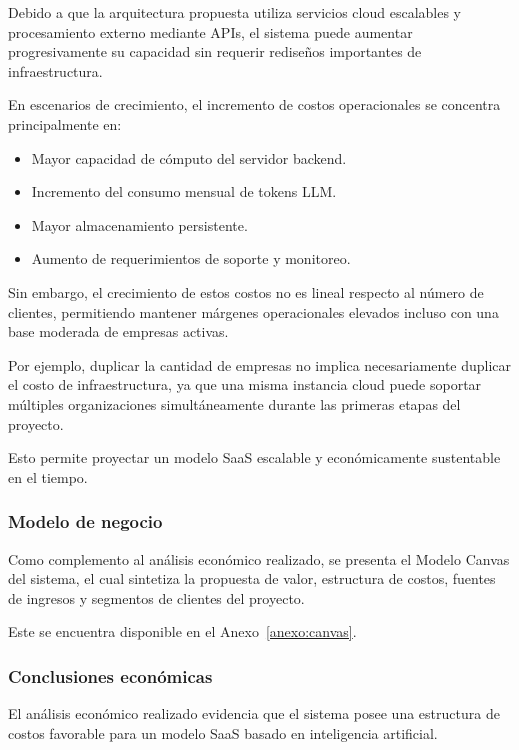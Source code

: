 Debido a que la arquitectura propuesta utiliza servicios cloud escalables y procesamiento externo mediante APIs, el sistema puede aumentar progresivamente su capacidad sin requerir rediseños importantes de infraestructura.

En escenarios de crecimiento, el incremento de costos operacionales se concentra principalmente en:

\begin{itemize}
    \item Mayor capacidad de cómputo del servidor backend.
    \item Incremento del consumo mensual de tokens LLM.
    \item Mayor almacenamiento persistente.
    \item Aumento de requerimientos de soporte y monitoreo.
\end{itemize}

Sin embargo, el crecimiento de estos costos no es lineal respecto al número de clientes, permitiendo mantener márgenes operacionales elevados incluso con una base moderada de empresas activas.

Por ejemplo, duplicar la cantidad de empresas no implica necesariamente duplicar el costo de infraestructura, ya que una misma instancia cloud puede soportar múltiples organizaciones simultáneamente durante las primeras etapas del proyecto.

Esto permite proyectar un modelo SaaS escalable y económicamente sustentable en el tiempo.

\subsubsection{Modelo de negocio}

Como complemento al análisis económico realizado, se presenta el Modelo Canvas del sistema, el cual sintetiza la propuesta de valor, estructura de costos, fuentes de ingresos y segmentos de clientes del proyecto.

Este se encuentra disponible en el Anexo~\ref{anexo:canvas}.

\subsubsection{Conclusiones económicas}

El análisis económico realizado evidencia que el sistema posee una estructura de costos favorable para un modelo SaaS basado en inteligencia artificial.

